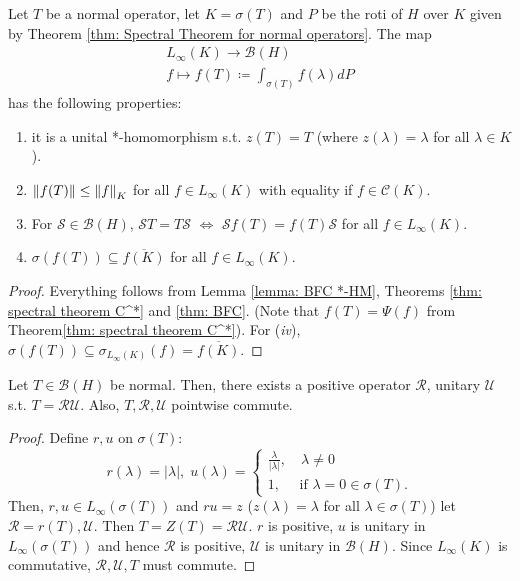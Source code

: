 \documentclass{article}
\begin{document}
\begin{theorem}\label{thm: BFC}
    Let $T$ be a normal operator, let $K=\sigma(T)$ and $P$ be the roti of $H$ over $K$ given by Theorem \ref{thm: Spectral Theorem for normal operators}. The map
    $$
    \begin{array}{cc}
        L_\infty(K)\to \mathcal{B}(H)\\
        f\mapsto f(T)\coloneq \displaystyle\int_{\sigma(T)} f(\lambda) dP 
    \end{array}
    $$
    has the following properties:
    \begin{enumerate}[label = (\roman*), align = left]
        \item it is a unital *-homomorphism s.t. $z(T)=T$ (where $z(\lambda)=\lambda$ for all $\lambda\in K$).
        \item $\left\lVert f(T)\right\rVert\leq \left\lVert f\right\rVert_K$ for all $f\in L_\infty(K)$ with equality if $f\in \mathcal{C}(K)$.
        \item For $\mathcal{S}\in\mathcal{B}(H)$, $\mathcal{S}T = T\mathcal{S}$ $\iff$ $\mathcal{S}f(T) = f(T)\mathcal{S}$ for all $f\in L_\infty(K)$.
        \item $\sigma(f(T))\subseteq\overline{f(K)}$ for all $f\in L_\infty(K)$.
    \end{enumerate}
\end{theorem}

\begin{proof}
    Everything follows from Lemma \ref{lemma: BFC *-HM}, Theorems \ref{thm: spectral theorem C^*} and \ref{thm: BFC}. (Note that $f(T)=\Psi(f)$ from Theorem\ref{thm: spectral theorem C^*}). For (\textit{iv}), $\sigma(f(T))\subseteq{\sigma_{L_\infty(K)}(f)}=\overline{f(K)}$.
\end{proof}

\begin{theorem}\label{thm: Polar decomposition}
    Let $T\in \mathcal{B}(H)$ be normal. Then, there exists a positive operator $\mathcal{R}$, unitary $\mathcal{U}$ s.t. $T = \mathcal{R}\mathcal{U}$. Also, $T,\mathcal{R},\mathcal{U}$ pointwise commute.
\end{theorem}

\begin{proof}
    Define $r,u$ on $\sigma(T)$:
    $$
    r(\lambda)=|\lambda|, \; u(\lambda)=
    \begin{cases}
        \frac{\lambda}{|\lambda|}, \quad \lambda\neq 0\\
        1, \quad \text{ if } \lambda=0\in\sigma(T).
    \end{cases}
    $$
    Then, $r,u\in L_\infty(\sigma(T))$ and $ru=z$ ($z(\lambda) = \lambda$ for all $\lambda\in\sigma(T)$) let $\mathcal{R} = r(T), \mathcal{U}$. Then $T = Z(T)=\mathcal{R}\mathcal{U}$. $r$ is positive, $u$ is unitary in $L_\infty(\sigma(T))$ and hence $\mathcal{R}$ is positive, $\mathcal{U}$ is unitary in $\mathcal{B}(H)$. Since $L_\infty(K)$ is commutative, $\mathcal{R}, \mathcal{U}, T$ must commute.
\end{proof}
\end{document}
